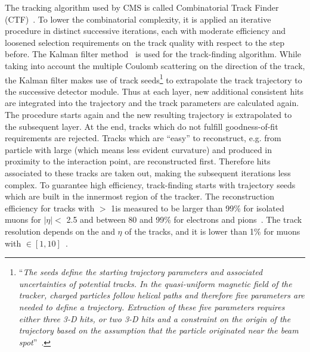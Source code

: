 The tracking algorithm used by CMS is called Combinatorial Track Finder (CTF)~\cite{Collaboration_2014_tracking}.
To lower the combinatorial complexity, it is applied an iterative
procedure in distinct successive iterations, each with moderate
efficiency and loosened selection requirements on the track quality with
respect to the step before. The Kalman
filter method~\cite{BILLOIR1990219} is used for the track-finding
algorithm. While taking into account the multiple Coulomb scattering on the
direction of the track, the Kalman filter makes use of track
seeds\footnote{``\emph{The seeds define the starting trajectory parameters and associated uncertainties of potential
tracks. In the quasi-uniform magnetic field of the tracker, charged particles follow helical paths
and therefore five parameters are needed to define a trajectory. Extraction of these five parameters
requires either three 3-D hits, or two 3-D hits and a constraint on the origin of the trajectory
based on the assumption that the particle originated near the beam
spot}''~\cite{Collaboration_2014_tracking}.} 
to extrapolate the track
trajectory to the successive detector module. Thus at each layer, new
additional consistent hits
are integrated into the trajectory and the track parameters are
calculated again. The procedure starts again and the new resulting
trajectory is extrapolated to the subsequent layer. At the end, tracks
which do not fulfill goodness-of-fit requirements are rejected. Tracks
which are ``easy'' to reconstruct, e.g. from particle with large \pt
(which means less evident curvature) and produced in proximity to the
interaction point, are reconstructed first. Therefore hits associated
to these tracks are taken out, making the subsequent iterations less
complex. To guarantee high efficiency, track-finding starts with
trajectory seeds which are built in the innermost region of the
tracker. 
The reconstruction efficiency for tracks with \pt $>$ 1\GeV  is measured to be larger
than 99\% for isolated muons for $|\eta| < $ 2.5 and between 80 and
99\% for electrons and pions~\cite{CMS:particleflow}. The track \pt
resolution depends on the \pt and $\eta$ of the tracks, and it is
lower than 1\% for muons with \pt $\in [1,10]$\GeV~\cite{CMS:particleflow}.\\

